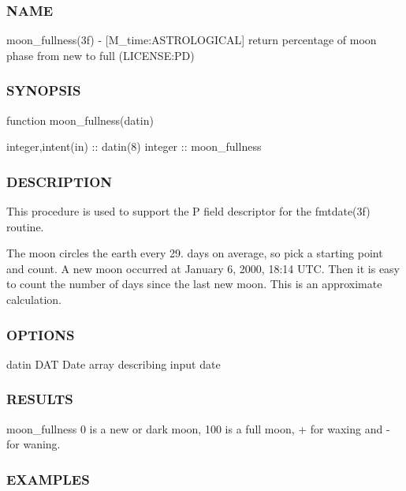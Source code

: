 \subsubsection*{N\+A\+ME}

moon\+\_\+fullness(3f) -\/ \mbox{[}M\+\_\+time\+:A\+S\+T\+R\+O\+L\+O\+G\+I\+C\+AL\mbox{]} return percentage of moon phase from new to full (L\+I\+C\+E\+N\+SE\+:PD) \subsubsection*{S\+Y\+N\+O\+P\+S\+IS}

function moon\+\_\+fullness(datin)

integer,intent(in) \+:\+: datin(8) integer \+:\+: moon\+\_\+fullness

\subsubsection*{D\+E\+S\+C\+R\+I\+P\+T\+I\+ON}

This procedure is used to support the P field descriptor for the fmtdate(3f) routine.

The moon circles the earth every 29. days on average, so pick a starting point and count. A new moon occurred at January 6, 2000, 18\+:14 U\+TC. Then it is easy to count the number of days since the last new moon. This is an approximate calculation.

\subsubsection*{O\+P\+T\+I\+O\+NS}

datin D\+AT Date array describing input date

\subsubsection*{R\+E\+S\+U\+L\+TS}

moon\+\_\+fullness 0 is a new or dark moon, 100 is a full moon, + for waxing and -\/ for waning.

\subsubsection*{E\+X\+A\+M\+P\+L\+ES}

